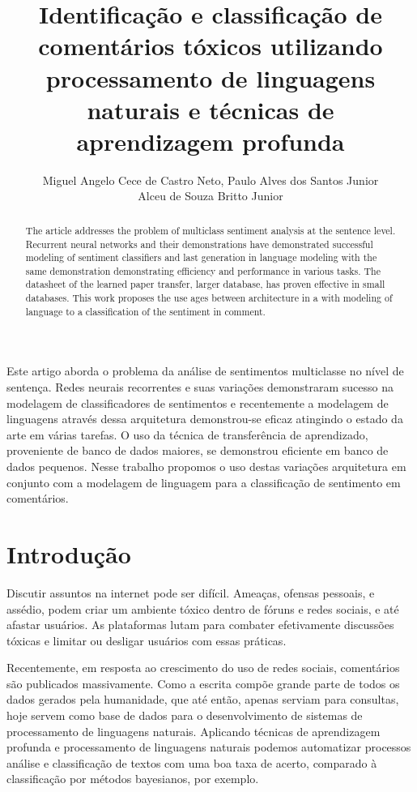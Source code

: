 \documentclass[12pt]{article}
\title{Identificação e classificação de comentários tóxicos utilizando processamento de linguagens naturais e técnicas de aprendizagem profunda}
\author{
    Miguel Angelo Cece de Castro Neto\inst{1},
    Paulo Alves dos Santos Junior\inst{1}\\
    Alceu de Souza Britto Junior\inst{2}
}
\begin{document}
\maketitle

\begin{abstract}
  The article addresses the problem of multiclass sentiment analysis at the sentence level. Recurrent neural networks and their demonstrations have demonstrated successful modeling of sentiment classifiers and last generation in language modeling with the same demonstration demonstrating efficiency and performance in various tasks. The datasheet of the learned paper transfer, larger database, has proven effective in small databases. This work proposes the use ages between architecture in a with modeling of language to a classification of the sentiment in comment.
\end{abstract}

\begin{resumo}
  Este artigo aborda o problema da análise de sentimentos multiclasse no nível de sentença. Redes neurais recorrentes e suas variações demonstraram sucesso na modelagem de classificadores de sentimentos e recentemente a modelagem de linguagens através dessa arquitetura demonstrou-se eficaz atingindo o estado da arte em várias tarefas. O uso da técnica de transferência de aprendizado, proveniente de banco de dados maiores, se demonstrou eficiente em banco de dados pequenos. Nesse trabalho propomos o uso destas variações arquitetura em conjunto com a modelagem de linguagem para a classificação de sentimento em comentários.
\end{resumo}


\section{Introdução} \label{sec:introducao}

Discutir assuntos na internet pode ser difícil. Ameaças, ofensas pessoais, e assédio, podem criar um ambiente tóxico dentro de fóruns e redes sociais, e até afastar usuários. As plataformas lutam para combater efetivamente discussões tóxicas e limitar ou desligar usuários com essas práticas.

Recentemente, em resposta ao crescimento do uso de redes sociais, comentários são publicados massivamente. Como a escrita compõe grande parte de todos os dados gerados pela humanidade, que até então, apenas serviam para consultas, hoje servem como base de dados para o desenvolvimento de sistemas de processamento de linguagens naturais. Aplicando técnicas de aprendizagem profunda e processamento de linguagens naturais podemos automatizar processos análise e classificação de textos com uma boa taxa de acerto, comparado à classificação por métodos bayesianos, por exemplo.
\end{document}
